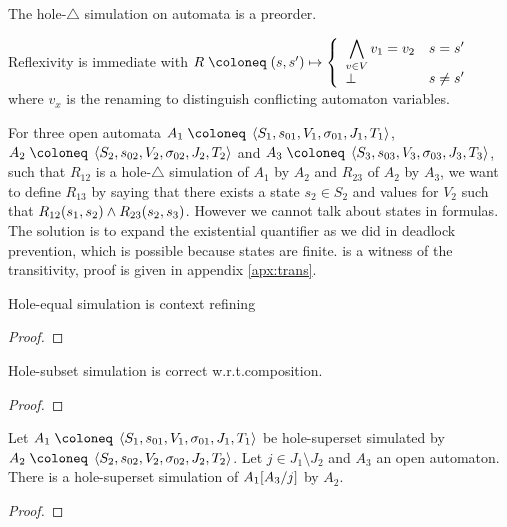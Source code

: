 \documentclass{article}
\begin{document}
\begin{thm} The hole-\(\triangle\) simulation on automata is a preorder. \end{thm}
Reflexivity is immediate with \(R \defobject \mpar{s, s'} \mapsto \choice{\bigwedge_{v \in V} v_1 = v_2 & s = s'\\ \bot & s \neq s'}\) where \(v_x\) is the renaming to distinguish conflicting automaton variables.

For three open automata \(A_1 \defobject \OAg[1]\), \(A_2 \defobject \OAg[2]\) and \(A_3 \defobject \OAg[3]\), such that \(R_{12}\) is a hole-\(\triangle\) simulation of \(A_1\) by \(A_2\) and \(R_{23}\) of \(A_2\) by \(A_3\), we want to define \(R_{13}\) by saying that there exists a state \(s_2 \in S_2\) and values for \(V_2\) such that \(R_{12}{\left(s_1, s_2\right)} \wedge R_{23}{\left(s_2, s_3\right)}\).
However we cannot talk about states in formulas.
The solution is to expand the existential quantifier as we did in deadlock prevention, which is possible because states are finite.
 is a witness of the transitivity, proof is given in appendix \ref{apx:trans}.
\begin{thm} Hole-equal simulation is context refining \end{thm}
\begin{proof}
\end{proof}
\begin{prop} Hole-subset simulation is correct w.r.t.\@ composition. \end{prop}
\begin{proof}
\end{proof}
\begin{prop}
Let \(A_1 \defobject \OAg[1]\) be hole-superset simulated by \(A_2 \defobject \OAg[2]\).
Let \(j \in J_1 \setminus J_2\) and \(A_3\) an open automaton.
There is a hole-superset simulation of \(A_1{\left[A_3\middle/j\right]}\) by \(A_2\).
\end{prop}
\begin{proof}
\end{proof}
\end{document}
